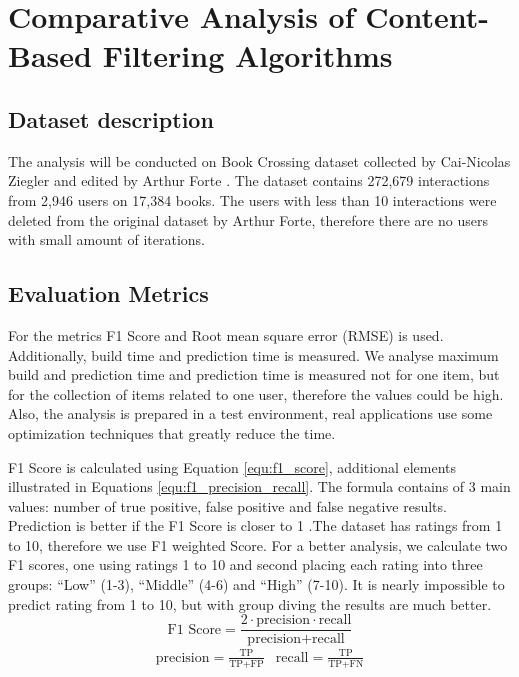 \section{Comparative Analysis of Content-Based Filtering Algorithms}\label{sec:dataset_analysis}

\subsection{Dataset description} %
The analysis will be conducted on Book Crossing dataset collected by Cai-Nicolas Ziegler and edited by Arthur Forte \cite{Dataset}. The dataset contains 272,679 interactions from 2,946 users on 17,384 books. The users with less than 10 interactions were deleted from the original dataset by Arthur Forte, therefore there are no users with small amount of iterations.

\subsection{Evaluation Metrics} %
For the metrics F1 Score and Root mean square error (RMSE) is used. Additionally, build time and prediction time is measured. We analyse maximum build and prediction time and prediction time is measured not for one item, but for the collection of items related to one user, therefore the values could be high. Also, the analysis is prepared in a test environment, real applications use some optimization techniques that greatly reduce the time.

F1 Score is calculated using Equation \eqref{equ:f1_score}, additional elements illustrated in Equations \eqref{equ:f1_precision_recall}. The formula contains of 3 main values: number of true positive, false positive and false negative results. Prediction is better if the F1 Score is closer to 1 \cite{F1Score}.The dataset has ratings from 1 to 10, therefore we use F1 weighted Score. For a better analysis, we calculate two F1 scores, one using ratings 1 to 10 and second placing each rating into three groups: “Low” (1-3), “Middle” (4-6) and “High” (7-10). It is nearly impossible to predict rating from 1 to 10, but with group diving the results are much better.
\begin{equation}
        \text{F1 Score} = \frac{2 \cdot \text{precision} \cdot \text{recall}}{\text{precision} + \text{recall}}\label{equ:f1_score}
\end{equation}
\begin{align}
        &\text{precision} = \frac{\text{TP}}{\text{TP} + \text{FP}} &
        \text{recall} = \frac{\text{TP}}{\text{TP} + \text{FN}} &\label{equ:f1_precision_recall}
\end{align}

